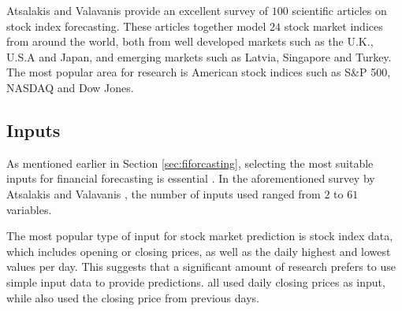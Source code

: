 \documentclass{UoYCSproject}
\begin{document}
Atsalakis and Valavanis \cite{atsalakis2009surveying} provide an excellent survey of $100$ scientific articles on stock index forecasting. These articles together model $24$ stock market indices from around the world, both from well developed markets such as the U.K., U.S.A and Japan, and emerging markets such as Latvia, Singapore and Turkey. The most popular area for research is American stock indices such as S\&P 500, NASDAQ and Dow Jones.

\subsection{Inputs}
As mentioned earlier in Section \ref{sec:fiforcasting}, selecting the most suitable inputs for financial forecasting is essential \cite{zhong2017forecasting}. In the aforementioned survey by Atsalakis and Valavanis \cite{atsalakis2009surveying}, the number of inputs used ranged from $2$ to $61$ variables. 

The most popular type of input for stock market prediction is stock index data, which includes opening or closing prices, as well as the daily highest and lowest values per day. This suggests that a significant amount of research prefers to use simple input data to provide predictions. \cite{barnes2000study, donaldson1999neural, halliday2004equity, tan1995conservative, pai2005hybrid, pantazopoulos1998financial} all used daily closing prices as input, while \cite{andreou2000testing, fernandez2000profitability, pan2005predicting,tang2002web} also used the closing price from previous days. 
\end{document}
